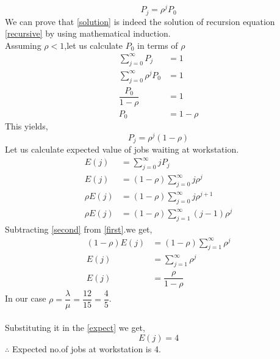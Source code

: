 \documentclass[journal,12pt,twocolumn]{IEEEtran}
\begin{document}
\begin{equation}
    P_j=\rho^j P_0 \label{solution}
\end{equation}
We can prove that \eqref{solution} is indeed the solution of recursion equation \eqref{recursive} by using mathematical induction.\\
Assuming $\rho<1$,let us calculate $P_0$ in terms of $\rho$
\begin{align}
    \sum_{j=0}^{\infty}P_j&=1\\
    \sum_{j=0}^{\infty}\rho^j P_0 &=1\\
    \dfrac{P_0}{1-\rho}&=1\\
    P_0&=1-\rho
\end{align}
This yields,\\
\begin{equation}
    P_j=\rho^j(1-\rho)
\end{equation}
Let us calculate expected value of jobs waiting at workstation.
\begin{align}
    E(j)&=\sum_{j=0}^{\infty}jP_j\\
    E(j)&=(1-\rho)\sum_{j=0}^{\infty}j\rho^j\label{first}\\
    \rho E(j)&=(1-\rho)\sum_{j=0}^{\infty}j\rho^{j+1}\\
    \rho E(j)&=(1-\rho)\sum_{j=1}^{\infty}(j-1)\rho^{j}\label{second}
\end{align}
Subtracting \eqref{second} from \eqref{first}.we get,
\begin{align}
    (1-\rho)E(j)&=(1-\rho)\sum_{j=1}^{\infty}\rho^j\\
    E(j)&=\sum_{j=1}^{\infty}\rho^j\\
    E(j)&=\dfrac{\rho}{1-\rho}\label{expect}
\end{align}
In our case $\rho=\dfrac{\lambda}{\mu}=\dfrac{12}{15}=\dfrac{4}{5}$.\\\\Substituting it in the \eqref{expect} we get,\\
\begin{equation}
    E(j)=4
\end{equation}
$\therefore$ Expected no.of jobs at workstation is 4.
\end{document}
